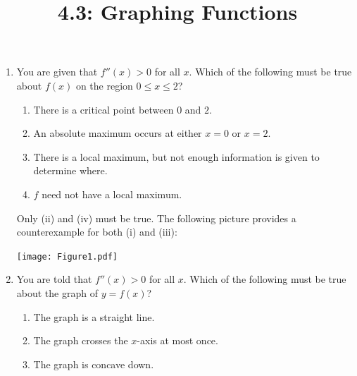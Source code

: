 \documentclass[nooutcomes]{ximera}
\title{4.3: Graphing Functions}
\begin{document}
\begin{abstract}
\end{abstract}
\maketitle

\begin{problem}
  \mbox{}
  \begin{enumerate}
    \item
      You are given that $f''(x) > 0$ for all $x$.
      Which of the following must be true about $f(x)$ on the region $0 \leq x \leq 2$?
      \begin{enumerate}
        \item
          There is a critical point between $0$ and $2$.

        \item
          An absolute maximum occurs at either $x=0$ or $x=2$.

        \item
          There is a local maximum, but not enough information is given to determine where.

        \item
          $f$ need not have a local maximum.
      \end{enumerate}
      \begin{freeResponse}
        Only (ii) and (iv) must be true.
        The following picture provides a counterexample for both (i) and (iii):
        \begin{image}
          \texttt{[image: Figure1.pdf]}
        \end{image}
      \end{freeResponse}
		
     \item
       You are told that $f''(x) > 0$ for all $x$.
       Which of the following must be true about the graph of $y=f(x)$?
       \begin{enumerate}
         \item
           The graph is a straight line.

         \item 
           The graph crosses the $x$-axis at most once.
         
         \item
           The graph is concave down.


\end{enumerate}
\end{enumerate}
\end{problem}
\end{document}
